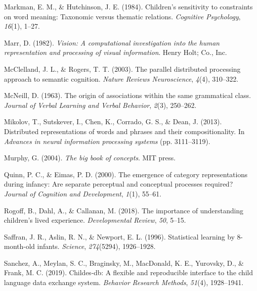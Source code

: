\documentclass[english,,man]{apa6}
\begin{document}
\leavevmode\hypertarget{ref-markman1984children}{}%
Markman, E. M., \& Hutchinson, J. E. (1984). Children's sensitivity to constraints on word meaning: Taxonomic versus thematic relations. \emph{Cognitive Psychology}, \emph{16}(1), 1--27.

\leavevmode\hypertarget{ref-marr1982}{}%
Marr, D. (1982). \emph{Vision: A computational investigation into the human representation and processing of visual information}. Henry Holt; Co., Inc.

\leavevmode\hypertarget{ref-mcclelland2003}{}%
McClelland, J. L., \& Rogers, T. T. (2003). The parallel distributed processing approach to semantic cognition. \emph{Nature Reviews Neuroscience}, \emph{4}(4), 310--322.

\leavevmode\hypertarget{ref-mcneill1963origin}{}%
McNeill, D. (1963). The origin of associations within the same grammatical class. \emph{Journal of Verbal Learning and Verbal Behavior}, \emph{2}(3), 250--262.

\leavevmode\hypertarget{ref-mikolov2013}{}%
Mikolov, T., Sutskever, I., Chen, K., Corrado, G. S., \& Dean, J. (2013). Distributed representations of words and phrases and their compositionality. In \emph{Advances in neural information processing systems} (pp. 3111--3119).

\leavevmode\hypertarget{ref-murphy2004big}{}%
Murphy, G. (2004). \emph{The big book of concepts}. MIT press.

\leavevmode\hypertarget{ref-quinn2000}{}%
Quinn, P. C., \& Eimas, P. D. (2000). The emergence of category representations during infancy: Are separate perceptual and conceptual processes required? \emph{Journal of Cognition and Development}, \emph{1}(1), 55--61.

\leavevmode\hypertarget{ref-rogoff2018}{}%
Rogoff, B., Dahl, A., \& Callanan, M. (2018). The importance of understanding children's lived experience. \emph{Developmental Review}, \emph{50}, 5--15.

\leavevmode\hypertarget{ref-saffran1996}{}%
Saffran, J. R., Aslin, R. N., \& Newport, E. L. (1996). Statistical learning by 8-month-old infants. \emph{Science}, \emph{274}(5294), 1926--1928.

\leavevmode\hypertarget{ref-sanchez2019}{}%
Sanchez, A., Meylan, S. C., Braginsky, M., MacDonald, K. E., Yurovsky, D., \& Frank, M. C. (2019). Childes-db: A flexible and reproducible interface to the child language data exchange system. \emph{Behavior Research Methods}, \emph{51}(4), 1928--1941.
\end{document}
